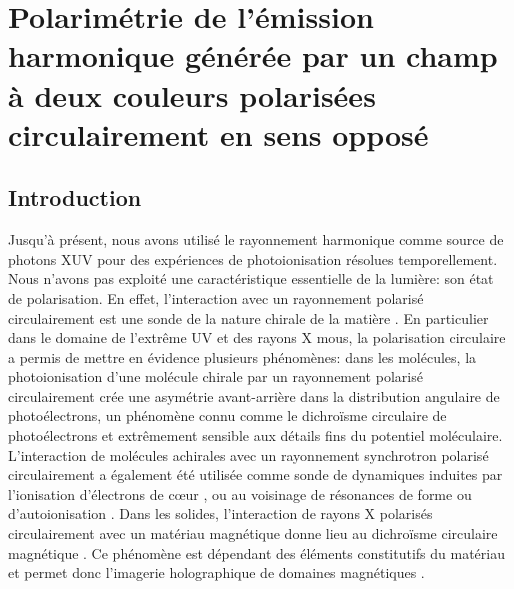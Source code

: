 \part{Polarimétrie de l'émission harmonique générée par un champ à deux couleurs polarisées circulairement en sens opposé}
\label{part:Polarimétrie}


\chapter*{Introduction}
Jusqu'à présent, nous avons utilisé le rayonnement harmonique comme source de photons XUV pour des expériences de photoionisation résolues temporellement. Nous n'avons pas exploité une caractéristique essentielle de la lumière: son état de polarisation.  En effet, l'interaction avec un rayonnement polarisé circulairement est une sonde de la nature chirale de la matière . En particulier dans le domaine de l'extrême UV et des rayons X mous, la polarisation circulaire a permis de mettre en évidence plusieurs phénomènes: dans les molécules, la photoionisation d'une molécule chirale par un rayonnement polarisé circulairement crée une asymétrie avant-arrière dans la distribution angulaire de photoélectrons, un phénomène connu comme le dichroïsme circulaire de photoélectrons  et extrêmement sensible aux détails fins du potentiel moléculaire. L'interaction de  molécules achirales avec un rayonnement synchrotron polarisé circulairement a également été utilisée comme sonde de dynamiques induites par l'ionisation d'électrons de c\oe ur , ou au voisinage de résonances de forme  ou d'autoionisation . Dans les solides, l'interaction de rayons X polarisés circulairement avec un matériau magnétique donne lieu au dichroïsme circulaire magnétique . Ce phénomène est dépendant des éléments constitutifs du matériau et permet donc l'imagerie holographique de domaines magnétiques . 


